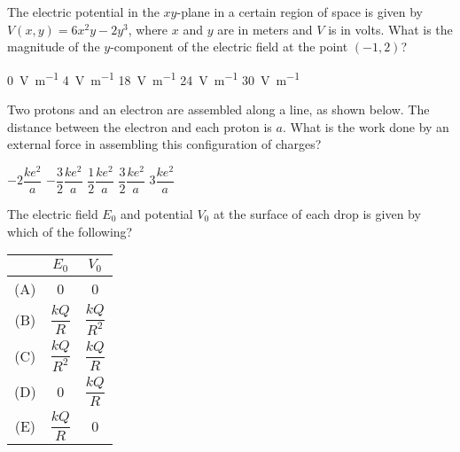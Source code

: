 \documentclass[12pt]{../oss-classkick-exam}
\begin{document}
\begin{questions}
  \question The electric potential in the $xy$-plane in a certain region of
  space is given by $V(x,y)=6x^2y-2y^3$, where $x$ and $y$ are in meters and
  $V$ is in volts. What is the magnitude of the $y$-component of the electric
  field at the point $(-1,2)$?
  \begin{choices}
    \choice\SI{0}{\volt\per\metre}
    \choice\SI{4}{\volt\per\metre}
    \choice\SI{18}{\volt\per\metre}
    \choice\SI{24}{\volt\per\metre}
    \choice\SI{30}{\volt\per\metre}
  \end{choices}

  \uplevel{ \rule{\linewidth}{.5pt}}
  

  \question Two protons and an electron are assembled along a line, as shown
  below. The distance between the electron and each proton is $a$. What is the
  work done by an external force in assembling this configuration of charges?
  \begin{choices}
    \choice $-2\dfrac{ke^2}a$
    \choice $-\dfrac32\dfrac{ke^2}a$
    \choice $\dfrac12\dfrac{ke^2}a$
    \choice $\dfrac32\dfrac{ke^2}a$
    \choice $3\dfrac{ke^2}a$
  \end{choices}


  \question The electric field $E_0$ and potential $V_0$ at the surface of each
  drop is given by which of the following?
  \label{rain1}
  
  \begin{tabular}{ccc}
    & $E_0$ & $V_0$ \\ \hline
    (A) & 0 & 0 \\
    (B) & $\dfrac{kQ}R$ & $\dfrac{kQ}{R^2}$ \\
    (C) & $\dfrac{kQ}{R^2}$ & $\dfrac{kQ}R$ \\
    (D) & 0 & $\dfrac{kQ}R$ \\
    (E) & $\dfrac{kQ}R$ & 0
  \end{tabular}


\end{questions}
\end{document}

